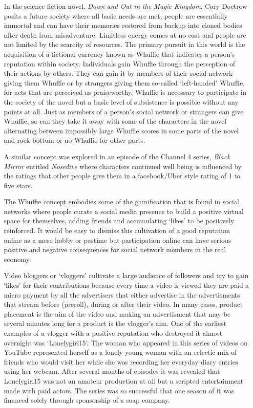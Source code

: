 In the science fiction novel, \textit{Down and Out in the Magic Kingdom}\cite{RefWorks:380}, Cory Doctrow posits a future society where all basic needs are met, people are essentially immortal and can have their memories restored from backup into cloned bodies after death from misadventure. Limitless energy comes at no cost and people are not limited by the scarcity of resources. The primary pursuit in this world is the acquisition of a fictional currency known as Whuffie that indicates a person's reputation within society. Individuals gain Whuffie through the perception of their actions by others. They can gain it  by members of their social network giving them Whuffie or by strangers giving them so-called `left-handed' Whuffie, for acts that are perceived as praiseworthy. Whuffie is necessary to participate in the society of the novel but a basic level of subsistence is possible without any points at all. Just as members of a person's social network or strangers can give Whuffie, so can they take it away with some of the characters in the novel alternating between impossibly large Whuffie scores in some parts of the novel and rock bottom or no Whuffie for other parts. 

A similar concept was explored in an episode of the Channel 4 series, \textit{Black Mirror} entitled \textit{Nosedive}\cite{RefWorks:385} where characters continued well being is influenced by the ratings that other people give them in a facebook/Uber style rating of 1 to five stars.

The Whuffie concept embodies some of the gamification that is found in social networks where people curate a social media presence to build a positive virtual space for themselves, adding friends and accumulating `likes' to be positively reinforced. It would be easy to dismiss this cultivation of a good reputation online as a mere hobby or pastime but participation online can have serious positive and negative consequences for social network members in the real economy.

Video bloggers or `vloggers' cultivate a large audience of followers and try to gain `likes' for their contributions because every time a video is viewed they are paid a micro payment by all the advertisers that either advertise in the advertisments that stream before (preroll), during or after their video. In many cases, product placement is the aim of the video and making an advertisment  that may be several minutes long for a product is the vlogger's aim. One of the earliest examples of a vlogger with a positive reputation who destroyed it almost overnight was `Lonelygirl15'\cite{RefWorks:381}. The woman who appeared in this series of videos on YouTube represented herself as a lonely young woman with an eclectic mix of friends who would visit her while she was recording her everyday diary entries using her webcam. After several months of episodes it was revealed that Lonelygirl15 was not an amateur production at all but a scripted entertainment made with paid actors. The series was so successful that one season of it was financed solely through sponsorship of a soap company. 

